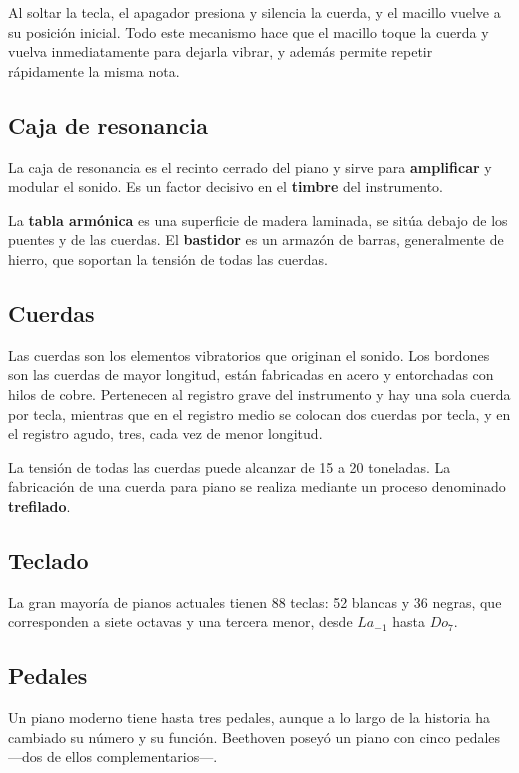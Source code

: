 \documentclass[10pt,a4paper]{article}
\begin{document}
	Al soltar la tecla, el apagador presiona y silencia la cuerda, y el macillo 
	vuelve a su posición inicial. Todo este mecanismo hace que el macillo 
	toque la cuerda y vuelva inmediatamente para dejarla vibrar, y además 
	permite repetir rápidamente la misma nota.
	
	\subsection{Caja de resonancia}
	
	La caja de resonancia es el recinto cerrado del piano y sirve para \textbf
	{amplificar} y modular el sonido. Es un factor decisivo en el \textbf
	{timbre} del instrumento.
	
	La \textbf{tabla armónica} es una superficie de madera laminada, se sitúa 
	debajo de los puentes y de las cuerdas. El \textbf{bastidor} es un armazón 
	de barras, generalmente de hierro, que soportan la tensión de todas las 
	cuerdas.
	
	\subsection{Cuerdas}
	
	Las cuerdas son los elementos vibratorios que originan el sonido. Los 
	bordones son las cuerdas de mayor longitud, están fabricadas en acero y 
	entorchadas con hilos de cobre. Pertenecen al registro grave del 
	instrumento y hay una sola cuerda por tecla, mientras que en el registro 
	medio se colocan dos cuerdas por tecla, y en el registro agudo, tres, cada 
	vez de menor longitud.
	
	La tensión de todas las cuerdas puede alcanzar de 15 a 20 toneladas. La 
	fabricación de una cuerda para piano se realiza mediante un proceso 
	denominado \textbf{trefilado}.
	
	\subsection{Teclado}
	
	La gran mayoría de pianos actuales tienen 88 teclas: 52 blancas y 36 
	negras, que corresponden a siete octavas y una tercera menor, desde 
	$La_{-1}$ hasta $Do_7$.
	
	\subsection{Pedales}
	
	Un piano moderno tiene hasta tres pedales, aunque a lo largo de la historia 
	ha cambiado su número y su función. Beethoven poseyó un piano con cinco 
	pedales ---dos de ellos complementarios---.
	
\end{document}
